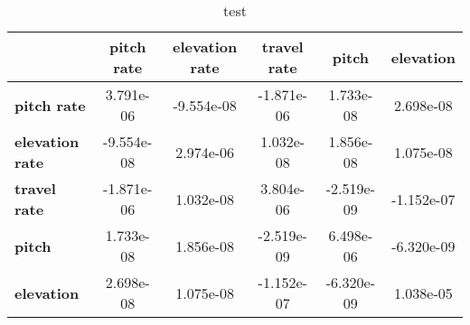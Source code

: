 \begin{table}[h!]
\centering
\begin{tiny}\begin{tabular}{|l|c|c|c|c|c|}
\hline
&\textbf{pitch rate}&\textbf{elevation rate}&\textbf{travel rate}&\textbf{pitch}&\textbf{elevation}\\\hline
\textbf{pitch rate}&3.791e-06&-9.554e-08&-1.871e-06&1.733e-08&2.698e-08\\\hline
\textbf{elevation rate}&-9.554e-08&2.974e-06&1.032e-08&1.856e-08&1.075e-08\\\hline
\textbf{travel rate}&-1.871e-06&1.032e-08&3.804e-06&-2.519e-09&-1.152e-07\\\hline
\textbf{pitch}&1.733e-08&1.856e-08&-2.519e-09&6.498e-06&-6.320e-09\\\hline
\textbf{elevation}&2.698e-08&1.075e-08&-1.152e-07&-6.320e-09&1.038e-05\\\hline
\end{tabular}
\end{tiny}
\caption{test}
\label{table:testtable}
\end{table}